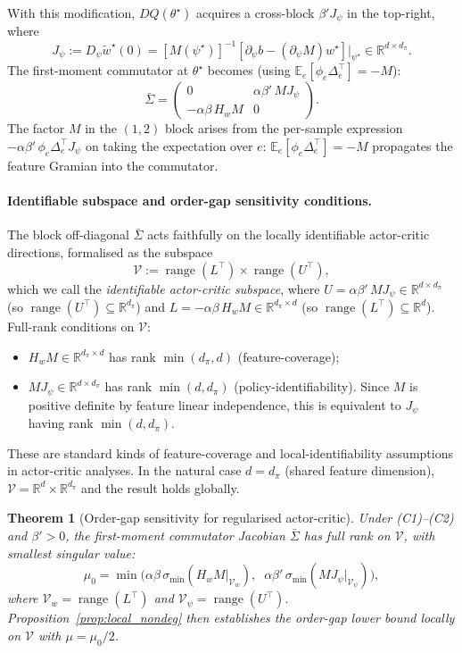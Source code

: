 \documentclass[12pt,a4paper]{article}
\newtheorem{theorem}[definition]{Theorem}
\newcommand{\R}{\mathbb{R}}
\begin{document}
With this modification, $DQ(\theta^\star)$ acquires a cross-block
$\beta' J_\psi$ in the top-right, where
\[
  J_\psi := D_\psi \widetilde{w}^\star(0)
  = [M(\psi^\star)]^{-1}
    [\partial_\psi b - (\partial_\psi M) w^\star]|_{\psi^\star}
  \in \R^{d \times d_\pi}.
\]
The first-moment commutator at $\theta^\star$ becomes (using
$\mathbb{E}_e[\phi_e \Delta_e^\top] = -M$):
\[
  \bar\Sigma
  = \begin{pmatrix}
      0 & \alpha\beta'\, M J_\psi \\
      -\alpha\beta\, H_w M & 0
    \end{pmatrix}.
\]
The factor $M$ in the $(1,2)$ block arises from the per-sample expression
$-\alpha\beta'\,\phi_e \Delta_e^\top J_\psi$ on taking the expectation over
$e$: $\mathbb{E}_e[\phi_e \Delta_e^\top] = -M$ propagates the feature
Gramian into the commutator.

\paragraph{Identifiable subspace and order-gap sensitivity conditions.}
The block off-diagonal $\bar\Sigma$ acts faithfully on the locally
identifiable actor-critic directions, formalised as the subspace
\[
  \mathcal{V} := \operatorname{range}(L^\top) \times \operatorname{range}(U^\top),
\]
which we call the \emph{identifiable actor-critic subspace},
where $U = \alpha\beta'\, M J_\psi \in \R^{d \times d_\pi}$ (so
$\operatorname{range}(U^\top) \subseteq \R^{d_\pi}$) and
$L = -\alpha\beta\, H_w M \in \R^{d_\pi \times d}$ (so
$\operatorname{range}(L^\top) \subseteq \R^d$). Full-rank conditions on $\mathcal{V}$:
\begin{itemize}
\item[(C1)] $H_w M \in \R^{d_\pi \times d}$ has rank $\min(d_\pi, d)$
  (feature-coverage);
\item[(C2)] $M J_\psi \in \R^{d \times d_\pi}$ has rank $\min(d, d_\pi)$
  (policy-identifiability). Since $M$ is positive definite by feature
  linear independence, this is equivalent to $J_\psi$ having rank
  $\min(d, d_\pi)$.
\end{itemize}
These are standard kinds of feature-coverage and local-identifiability
assumptions in actor-critic analyses. In the natural case $d = d_\pi$
(shared feature dimension), $\mathcal{V} = \R^d \times \R^{d_\pi}$ and the
result holds globally.

\begin{theorem}[Order-gap sensitivity for regularised actor-critic]
\label{prop:rl_nondeg}
Under (C1)--(C2) and $\beta' > 0$, the first-moment commutator Jacobian
$\bar\Sigma$ has full rank on $\mathcal{V}$, with smallest singular value:
\[
  \mu_0 = \min\bigl(
    \alpha\beta\, \sigma_{\min}(H_w M\big|_{\mathcal{V}_w}),\;\;
    \alpha\beta'\, \sigma_{\min}(M J_\psi\big|_{\mathcal{V}_\psi})
  \bigr),
\]
where $\mathcal{V}_w = \operatorname{range}(L^\top)$ and
$\mathcal{V}_\psi = \operatorname{range}(U^\top)$.
Proposition~\ref{prop:local_nondeg} then establishes the order-gap lower
bound locally on $\mathcal{V}$ with $\mu = \mu_0 / 2$.
\end{theorem}
\end{document}
